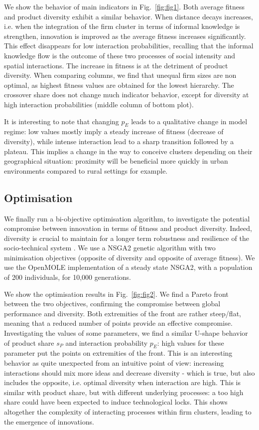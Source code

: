 \documentclass[letterpaper]{article}
\begin{document}
We show the behavior of main indicators in Fig.~\ref{fig:fig1}. Both average fitness and product diversity exhibit a similar behavior. When distance decays increases, i.e. when the integration of the firm cluster in terms of informal knowledge is strengthen, innovation is improved as the average fitness increases significantly. This effect disappears for low interaction probabilities, recalling that the informal knowledge flow is the outcome of these two processes of social intensity and spatial interactions. The increase in fitness is at the detriment of product diversity. When comparing columns, we find that unequal firm sizes are non optimal, as highest fitness values are obtained for the lowest hierarchy. The crossover share does not change much indicator behavior, except for diversity at high interaction probabilities (middle column of bottom plot).

It is interesting to note that changing $p_E$ leads to a qualitative change in model regime: low values mostly imply a steady increase of fitness (decrease of diversity), while intense interaction lead to a sharp transition followed by a plateau. This implies a change in the way to conceive clusters depending on their geographical situation: proximity will be beneficial more quickly in urban environments compared to rural settings for example.




\subsection{Optimisation}

We finally run a bi-objective optimisation algorithm, to investigate the potential compromise between innovation in terms of fitness and product diversity. Indeed, diversity is crucial to maintain for a longer term robustness and resilience of the socio-technical system \citep{reinmoeller2005link}. We use a NSGA2 genetic algorithm with two minimisation objectives (opposite of diversity and opposite of average fitness). We use the OpenMOLE implementation of a steady state NSGA2, with a population of 200 individuals, for 10,000 generations.

We show the optimisation results in Fig.~\ref{fig:fig2}. We find a Pareto front between the two objectives, confirming the compromise between global performance and diversity. Both extremities of the front are rather steep/flat, meaning that a reduced number of points provide an effective compromise. Investigating the values of some parameters, we find a similar U-shape behavior of product share $s_P$ and interaction probability $p_E$: high values for these parameter put the points on extremities of the front. This is an interesting behavior as quite unexpected from an intuitive point of view: increasing interactions should mix more ideas and decrease diversity - which is true, but also includes the opposite, i.e. optimal diversity when interaction are high. This is similar with product share, but with different underlying processes: a too high share could have been expected to induce technological locks. This shows altogether the complexity of interacting processes within firm clusters, leading to the emergence of innovations.
\end{document}
